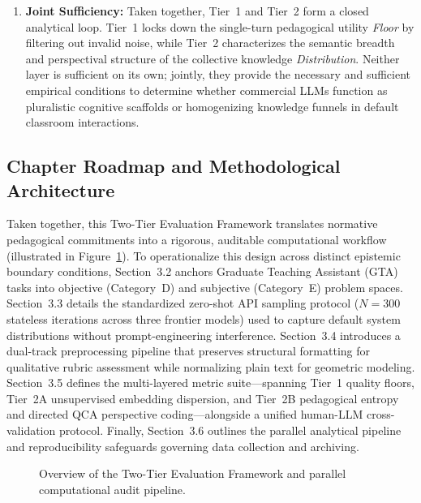 \begin{enumerate}
  \item \textbf{Joint Sufficiency:} Taken together, Tier~1 and Tier~2 form a closed analytical loop. Tier~1 locks down the single-turn pedagogical utility \textit{Floor} by filtering out invalid noise, while Tier~2 characterizes the semantic breadth and perspectival structure of the collective knowledge \textit{Distribution}. Neither layer is sufficient on its own; jointly, they provide the necessary and sufficient empirical conditions to determine whether commercial LLMs function as pluralistic cognitive scaffolds or homogenizing knowledge funnels in default classroom interactions.
\end{enumerate}

\subsection{Chapter Roadmap and Methodological Architecture}

Taken together, this Two-Tier Evaluation Framework translates normative pedagogical commitments into a rigorous, auditable computational workflow (illustrated in Figure~\ref{fig:method_architecture}). To operationalize this design across distinct epistemic boundary conditions, Section~3.2 anchors Graduate Teaching Assistant (GTA) tasks into objective (Category~D) and subjective (Category~E) problem spaces. Section~3.3 details the standardized zero-shot API sampling protocol ($N = 300$ stateless iterations across three frontier models) used to capture default system distributions without prompt-engineering interference. Section~3.4 introduces a dual-track preprocessing pipeline that preserves structural formatting for qualitative rubric assessment while normalizing plain text for geometric modeling. Section~3.5 defines the multi-layered metric suite—spanning Tier~1 quality floors, Tier~2A unsupervised embedding dispersion, and Tier~2B pedagogical entropy and directed QCA perspective coding—alongside a unified human-LLM cross-validation protocol. Finally, Section~3.6 outlines the parallel analytical pipeline and reproducibility safeguards governing data collection and archiving.

\begin{figure}[htbp]
  \centering
  \resizebox{\textwidth}{!}{%
    
  }
  \caption{Overview of the Two-Tier Evaluation Framework and parallel computational audit pipeline.}
  \label{fig:method_architecture}
\end{figure}

